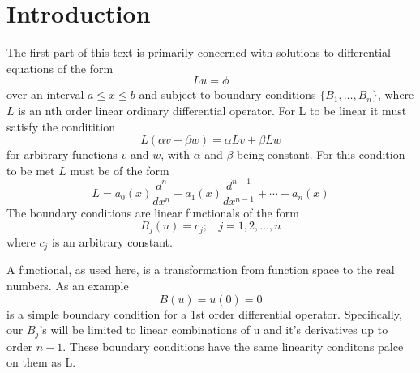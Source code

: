 \section{Introduction}
The first part of this text is primarily concerned with solutions to differential equations of the form
\begin{equation}
    Lu=\phi
\end{equation}
over an interval \(a \leq x \leq b\) and subject to boundary conditions \( \{ B_1, \dots ,B_n \} \), where \(L\) is an nth order linear ordinary differential operator.  For L to be linear it must satisfy the conditition
\begin{equation}
	L(\alpha v + \beta w) = \alpha Lv + \beta Lw
\end{equation}
for arbitrary functions \(v\) and \(w\), with \(\alpha\) and \(\beta\) being constant. For this condition to be met \(L\) must be of the form
\begin{equation} 
	L = a_0(x) \frac{d^n}{dx^n} + a_1(x) \frac{d^{n-1}}{dx^{n-1}} + \cdots + a_n(x)
\end{equation}
The boundary conditions are linear functionals of the form 
\begin{equation}
	B_j (u) = c_j;~~~~ j=1,2,\dots,n
\end{equation}
where \(c_j\) is an arbitrary constant. 

A functional, as used here, is a transformation from function space to the real numbers. As an example
\begin{equation}
	B (u) = u(0) = 0
\end{equation}
is a simple boundary condition for a 1st order differential operator. Specifically, our \(B_j\)'s will be limited to linear combinations of u and it's derivatives up to order \(n-1\). These boundary conditions have the same linearity conditons palce on them as L. 

